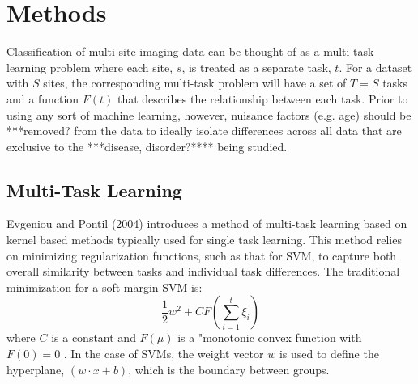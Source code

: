 \documentclass{llncs}
\begin{document}

\section{Methods}
Classification of multi-site imaging data can be thought of as a multi-task learning problem where each site,  $s$, is treated as a separate task, $t$.  For a dataset with $S$ sites, the corresponding multi-task problem will have a set of $T = S$ tasks and a function $F(t)$ that describes the relationship between each task.
Prior to using any sort of machine learning, however, nuisance factors (e.g. age) should be ***removed? from the data to ideally isolate differences across all data that are exclusive to the ***disease, disorder?**** being studied.


\subsection{Multi-Task Learning}
Evgeniou and Pontil (2004) introduces a method of multi-task learning based on kernel based methods typically used for single task learning.  This method relies on minimizing regularization functions, such as that for SVM, to capture both overall similarity between tasks and individual task differences.  The traditional minimization for a soft margin SVM is:\\
\begin{equation}
\label{eq:svm}
\frac{1}{2}w^2 + C F(\sum_{i=1}^t \xi_i)
\end{equation}
where $C$ is a constant and $F(\mu)$ is a "monotonic convex function with $F(0)=0$ \cite{svm}. In the case of SVMs, the weight vector $w$ is used to define the hyperplane, $(w \cdot x +b)$,  which is the boundary between groups.
\end{document}
